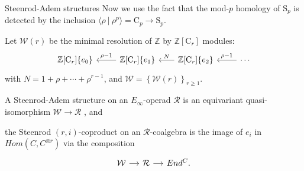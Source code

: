 \documentclass[10pt,t, handout]{beamer} %
\renewcommand{\S}{\mathrm{S}}
\newcommand{\C}{\mathrm{C}}
\begin{document}
\begin{frame}[fragile]{Steenrod-Adem structures}
	Now we use the fact that the mod-$p$ homology of $\S_p$ is detected by the inclusion $\langle \rho\ |\ \rho^p\rangle = \C_p \to \S_p$.
	
	\pause \vspace*{10pt}
	
	Let $\mathcal W(r)$ be the minimal resolution of $\mathbb{Z}$ by $\mathbb{Z}[\C_r]$ modules:
	\begin{equation*}
	\begin{tikzcd}[column sep=normal]
	\mathbb{Z}[\C_r]\{e_0\} & \arrow[l, "\rho-1"'] \mathbb{Z}[\C_r]\{e_1\} &[-5pt] \arrow[l, "N"']
	\mathbb{Z}[\C_r]\{e_2\} & \arrow[l, "\rho-1"'] \cdots
	\end{tikzcd}
	\end{equation*}
	with $N = 1+\rho+\cdots+\rho^{r-1}$, and $\mathcal{W} = \left\{\mathcal{W}(r)\right\}_{r \geq 1}$.
	
	\pause \vspace*{10pt}
	
	A \textcolor{pblue}{Steenrod-Adem structure} on an $E_\infty$-operad $\mathcal R$ is an equivariant quasi-isomorphism $\mathcal W \to \mathcal R$ \pause, and
	
	\vspace*{10pt}
	
	the \textcolor{pblue}{Steenrod $(r, i)$-coproduct} on an $\mathcal R$-coalgebra is the image
	of $e_i$ in $Hom(C, C^{\otimes r})$ via the composition	
	\begin{equation*}
	\begin{tikzcd}[column sep=small]
	\mathcal W \arrow[r] & \mathcal R \arrow[r] & End^C.
	\end{tikzcd}
	\end{equation*}		
\end{frame}
\end{document}
